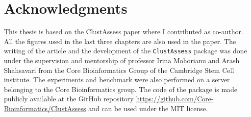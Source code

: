 \chapter*{Acknowledgments} 

This thesis is based on the ClustAssess paper \cite{clustassess} where I contributed as co-author. All the figures used in the last three chapters are also used in the paper. The writing of the article and the development of the \verb|ClustAssess| package was done under the supervision and mentorship of professor Irina Mohorianu and Arash Shahsavari from the Core Bioinformatics Group of the Cambridge Stem Cell institute. The experiments and benchmark were also performed on a server belonging to the Core Bioinformatics group. The code of the package is made publicly available at the GitHub repository \url{https://github.com/Core-Bioinformatics/ClustAssess} and can be used under the MIT license.